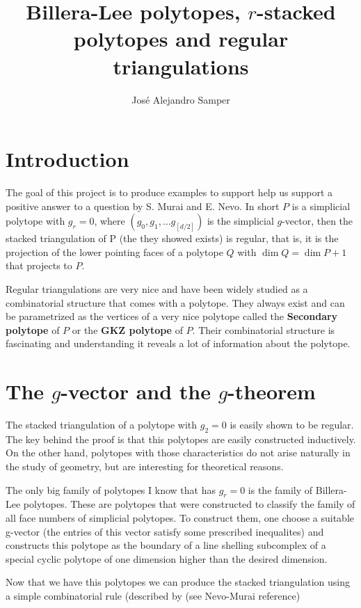 \documentclass[12pt]{article}
\theoremstyle{definition}
\begin{document}
\title{Billera-Lee polytopes, $r$-stacked polytopes and regular triangulations}
\author{Jos\'e Alejandro Samper}
\maketitle
\section{Introduction}
The goal of this project is to produce examples to support help us support a positive answer to a question by S. Murai and E. Nevo. In short  $P$ is a simplicial polytope with $g_r= 0$, where $(g_0,g_1, \dots g_[d/2])$ is the simplicial $g$-vector, then the stacked triangulation of P (the they showed exists) is regular, that is, it is the projection of the lower pointing faces of a polytope $Q$ with $\dim Q = \dim P + 1$ that projects to $P$. 

Regular triangulations are very nice and have been widely studied as a combinatorial structure that comes with a polytope. They always exist and can be parametrized as the vertices of a very nice polytope called the {\bf Secondary polytope} of $P$ or  the {\bf GKZ polytope} of $P$. Their combinatorial structure is fascinating and understanding it reveals a lot of information about the polytope. 

\section{The $g$-vector and the $g$-theorem}
The stacked triangulation of a polytope with $g_2 = 0$ is easily shown to be regular. The key behind the proof is that 
this polytopes are easily constructed inductively. On the other hand, polytopes with those characteristics do not arise
naturally in the study of geometry, but are interesting for theoretical reasons. 

The only big family of polytopes I know that has $g_r=0$ is the family of Billera-Lee polytopes. These are polytopes that 
were constructed to classify the family of all face numbers of simplicial polytopes. To construct them, one choose a 
suitable g-vector (the entries of this vector satisfy some prescribed inequalites) and constructs this polytope as the
boundary of a line shelling subcomplex of a special cyclic polytope of one dimension higher than the desired dimension. 

Now that we have this polytopes we can produce the stacked triangulation using a simple combinatorial rule (described by 
(see Nevo-Murai reference) 
\end{document}
